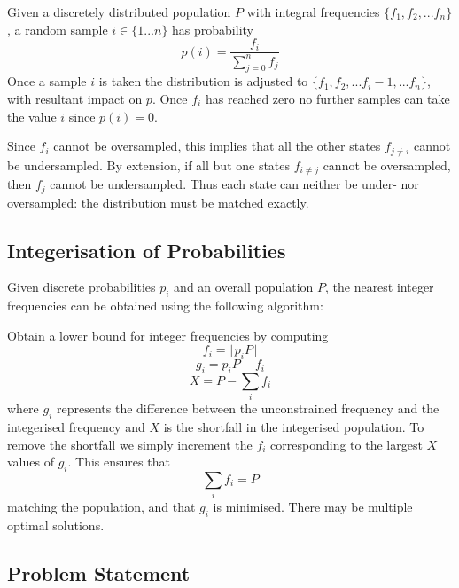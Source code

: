 \documentclass{JASSS}
\begin{document}
Given a discretely distributed population \(P\) with integral frequencies
\(\{f_1,f_2,...f_n\}\), a random sample \(i \in \{1...n\}\) has
probability
\begin{equation}
p(i) = \frac{f_i}{\sum\limits_{j=0}^{n}f_j}
\end{equation}
Once a sample \(i\) is taken the distribution is adjusted to
\(\{f_1,f_2,...f_i-1,...f_n\}\), with resultant impact on \(p\). Once
\(f_i\) has reached zero no further samples can take the value \(i\)
since \(p(i) = 0\).

Since \(f_i\) cannot be oversampled, this implies that all the other
states \(f_{j\neq{i}}\) cannot be undersampled. By extension, if all but
one states \(f_{i\neq{j}}\) cannot be oversampled, then \(f_j\) cannot
be undersampled. Thus each state can neither be under- nor oversampled:
the distribution must be matched exactly.

\subsection{Integerisation of Probabilities}\label{integerisation-of-probabilities}

Given discrete probabilities \(p_i\) and an overall population \(P\), the nearest integer frequencies can be obtained using the following algorithm:

Obtain a lower bound for integer frequencies by computing
\begin{equation}
f_i = \lfloor p_{i}P \rfloor
\end{equation}
\begin{equation}
g_i = p_i P - f_i
\end{equation}
\begin{equation}
X = P - \sum\limits_i{f_i}
\end{equation}
where \(g_i\) represents the difference between the unconstrained frequency and the integerised frequency and \(X\) is the shortfall in the integerised population. To remove the shortfall we simply increment the \(f_i\) corresponding to the largest \(X\) values of \(g_i\). This ensures that
\begin{equation}
\sum\limits_i{f_i} = P 
\end{equation}
matching the population, and that \(g_i\) is minimised. There may be multiple optimal solutions. 

\subsection{Problem Statement}\label{problem-statement}
\end{document}
